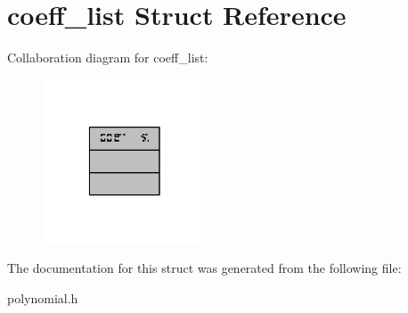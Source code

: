 \hypertarget{structcoeff__list}{\section{coeff\-\_\-list Struct Reference}
\label{structcoeff__list}
}


Collaboration diagram for coeff\-\_\-list\-:
\nopagebreak
\begin{figure}[H]
\begin{center}
\leavevmode
\includegraphics[width=138pt]{structcoeff__list__coll__graph}
\end{center}
\end{figure}


The documentation for this struct was generated from the following file\-:\begin{DoxyCompactItemize}
\item 
polynomial.\-h\end{DoxyCompactItemize}
